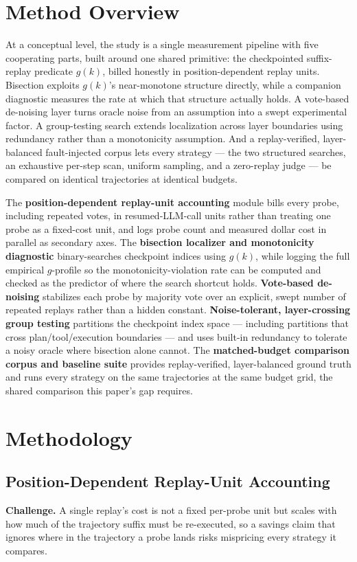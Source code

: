\documentclass[11pt]{article}
\begin{document}
\section{Method Overview}

At a conceptual level, the study is a single measurement pipeline with five cooperating parts, built around one shared primitive: the checkpointed suffix-replay predicate $g(k)$, billed honestly in position-dependent replay units. Bisection exploits $g(k)$'s near-monotone structure directly, while a companion diagnostic measures the rate at which that structure actually holds. A vote-based de-noising layer turns oracle noise from an assumption into a swept experimental factor. A group-testing search extends localization across layer boundaries using redundancy rather than a monotonicity assumption. And a replay-verified, layer-balanced fault-injected corpus lets every strategy --- the two structured searches, an exhaustive per-step scan, uniform sampling, and a zero-replay judge --- be compared on identical trajectories at identical budgets.

The \textbf{position-dependent replay-unit accounting} module bills every probe, including repeated votes, in resumed-LLM-call units rather than treating one probe as a fixed-cost unit, and logs probe count and measured dollar cost in parallel as secondary axes. The \textbf{bisection localizer and monotonicity diagnostic} binary-searches checkpoint indices using $g(k)$, while logging the full empirical $g$-profile so the monotonicity-violation rate can be computed and checked as the predictor of where the search shortcut holds. \textbf{Vote-based de-noising} stabilizes each probe by majority vote over an explicit, swept number of repeated replays rather than a hidden constant. \textbf{Noise-tolerant, layer-crossing group testing} partitions the checkpoint index space --- including partitions that cross plan/tool/execution boundaries --- and uses built-in redundancy to tolerate a noisy oracle where bisection alone cannot. The \textbf{matched-budget comparison corpus and baseline suite} provides replay-verified, layer-balanced ground truth and runs every strategy on the same trajectories at the same budget grid, the shared comparison this paper's gap requires.

\section{Methodology}

\subsection{Position-Dependent Replay-Unit Accounting}
\textbf{Challenge.} A single replay's cost is not a fixed per-probe unit but scales with how much of the trajectory suffix must be re-executed, so a savings claim that ignores where in the trajectory a probe lands risks mispricing every strategy it compares.
\end{document}
